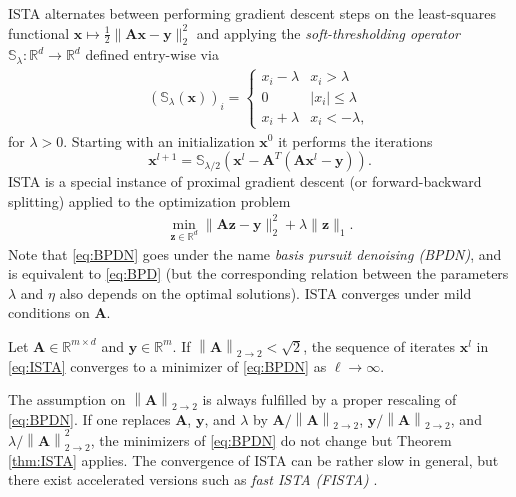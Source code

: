 \documentclass{svproc}
\newcommand{\bA}{\boldsymbol{A}}
\newcommand{\bx}{\boldsymbol{x}}
\newcommand{\by}{\boldsymbol{y}}
\newcommand{\bz}{\boldsymbol{z}}
\newcommand{\0}{\boldsymbol{0}}
\newcommand{\1}{\boldsymbol{1}}
\def\R{\mathbb{R}}
\newcommand{\St}{\mathbb{S}}
\newcommand{\pnorm}[2]{\left\| #1 \right\|_{#2}}
\begin{document}
ISTA alternates between performing gradient descent steps on the least-squares functional $\bx \mapsto \frac{1}{2} \| \bA\bx - \by \|_2^2$ and applying the \emph{soft-thresholding operator} $\St_\lambda \colon \R^d \to \R^d$ defined entry-wise via
\begin{align} \label{eq:St}
    (\St_\lambda (\bx))_i = \begin{cases}
    x_i - \lambda    & x_i > \lambda \\
    0               & |x_i| \le \lambda \\
    x_i + \lambda    & x_i < -\lambda,
    \end{cases}
\end{align}
for $\lambda > 0$. Starting with an initialization $\bx^0$ it performs the iterations
\begin{equation}
\label{eq:ISTA}
\bx^{l+1} = \mathbb S_{\lambda/2}(\bx^l -\bA^T(\bA\bx^l-\by)).
\end{equation}
ISTA is a special instance of proximal gradient descent \cite{parikh2014proximal} (or forward-backward splitting) applied to the optimization problem
\begin{align}
\label{eq:BPDN}
    \min_{\bz \in \R^d} \| \bA\bz - \by \|_2^2 + \lambda \| \bz \|_1.
\end{align}
Note that \eqref{eq:BPDN} goes under the name \emph{basis pursuit denoising (BPDN)}, and is equivalent to \eqref{eq:BPD} \cite[Proposition 3.2]{foucart2013mathematical} (but the corresponding relation between the parameters $\lambda$ and $\eta$ also depends on the optimal solutions). 
ISTA converges under mild conditions on $\bA$.

\begin{theorem} \label{thm:ISTA}
    Let $\bA \in \R^{m\times d}$ and $\by \in \R^m$. If $\pnorm{\bA}{2\rightarrow 2} < \sqrt{2}$, the sequence of iterates $\bx^l$ in 
    \eqref{eq:ISTA}
    converges to a minimizer of \eqref{eq:BPDN} as $\ell \to \infty$.
\end{theorem}

The assumption on $\pnorm{\bA}{2\rightarrow 2}$ is always fulfilled by a proper rescaling of \eqref{eq:BPDN}. If one replaces $\bA$, $\by$, and $\lambda$ by $\bA/\pnorm{\bA}{2\rightarrow 2}$, $\by/\pnorm{\bA}{2\rightarrow 2}$, and $\lambda/\pnorm{\bA}{2\rightarrow 2}^2$, the minimizers of \eqref{eq:BPDN} do not change but Theorem \ref{thm:ISTA} applies.
The convergence of ISTA can be rather slow in general, but there exist accelerated versions such as \emph{fast ISTA (FISTA)} \cite{beck2009fast}.
\end{document}
